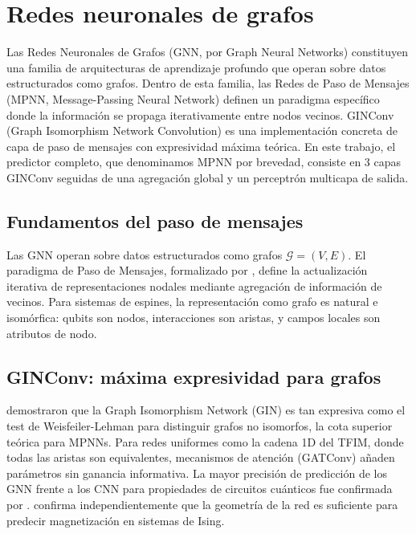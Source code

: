 \documentclass[11pt,a4paper,spanish]{book}
\begin{document}
\section{Redes neuronales de grafos}

Las Redes Neuronales de Grafos (GNN, por Graph Neural Networks) constituyen una familia de arquitecturas de aprendizaje profundo que operan sobre datos estructurados como grafos. Dentro de esta familia, las Redes de Paso de Mensajes (MPNN, Message-Passing Neural Network) \citep{gilmer2017} definen un paradigma específico donde la información se propaga iterativamente entre nodos vecinos. GINConv (Graph Isomorphism Network Convolution) \citep{xu2019} es una implementación concreta de capa de paso de mensajes con expresividad máxima teórica. En este trabajo, el predictor completo, que denominamos MPNN por brevedad, consiste en 3 capas GINConv seguidas de una agregación global y un perceptrón multicapa de salida.

\subsection{Fundamentos del paso de mensajes}

Las GNN operan sobre datos estructurados como grafos $\mathcal{G} = (V, E)$. El paradigma de Paso de Mensajes, formalizado por \citet{gilmer2017}, define la actualización iterativa de representaciones nodales mediante agregación de información de vecinos. Para sistemas de espines, la representación como grafo es natural e isomórfica: qubits son nodos, interacciones son aristas, y campos locales son atributos de nodo.

\subsection{GINConv: máxima expresividad para grafos}

\citet{xu2019} demostraron que la Graph Isomorphism Network (GIN) es tan expresiva como el test de Weisfeiler-Lehman para distinguir grafos no isomorfos, la cota superior teórica para MPNNs. Para redes uniformes como la cadena 1D del TFIM, donde todas las aristas son equivalentes, mecanismos de atención (GATConv) añaden parámetros sin ganancia informativa. La mayor precisión de predicción de los GNN frente a los CNN para propiedades de circuitos cuánticos fue confirmada por \citet{meng2025}. \citet{slavin2025} confirma independientemente que la geometría de la red es suficiente para predecir magnetización en sistemas de Ising.
\end{document}
